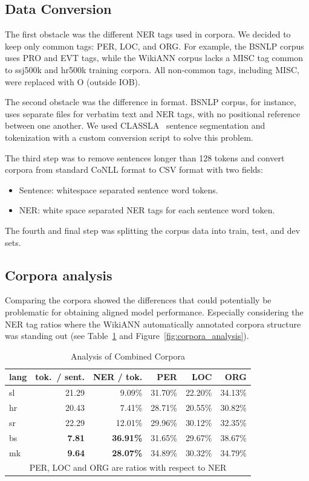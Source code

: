 \documentclass[sigconf]{acmart}
\begin{document}
\subsection{Data Conversion}
\label{subsec:data-conversion}
The first obstacle was the different NER tags used in corpora.
We decided to keep only common tags: PER, LOC, and ORG\@.
For example, the BSNLP corpus uses PRO and EVT tags, while the WikiANN corpus lacks a MISC tag common to ssj500k and hr500k training corpora.
All non-common tags, including MISC, were replaced with O (outside IOB).

The second obstacle was the difference in format.
BSNLP corpus, for instance, uses separate files for verbatim text and NER tags, with no positional reference between one another.
We used CLASSLA~\cite{ljubesic-dobrovoljc-2019-neural} sentence segmentation and tokenization with a custom conversion script to solve this problem.

The third step was to remove sentences longer than 128 tokens and convert corpora from standard CoNLL format to CSV format with two fields:
\begin{itemize}
  \item Sentence: whitespace separated sentence word tokens.
  \item NER: white space separated NER tags for each sentence word token.
\end{itemize}

The fourth and final step was splitting the corpus data into train, test, and dev sets.

\subsection{Corpora analysis}
\label{subsec:corpora-analysis}
Comparing the corpora showed the differences that could potentially be problematic for obtaining aligned model performance.
Especially considering the NER tag ratios where the WikiANN automatically annotated corpora structure was standing
out (see Table~\ref{tab:corpora_analysis} and Figure~\ref{fig:corpora_analysis}).
\begin{table}[H]
  \caption{Analysis of Combined Corpora}
  \label{tab:corpora_analysis}
  \begin{tabular}{lrrrrr}
    \toprule
    lang&tok.\ / sent.&NER / tok.&PER&LOC&ORG\\
    \midrule
    sl&21.29&9.09\%&31.70\%&22.20\%&34.13\%\\
    hr&20.43&7.41\%&28.71\%&20.55\%&30.82\%\\
    sr&22.29&12.01\%&29.96\%&30.12\%&32.35\%\\
    bs&\textbf{7.81}&\textbf{36.91\%}&31.65\%&29.67\%&38.67\%\\
    mk&\textbf{9.64}&\textbf{28.07\%}&34.89\%&30.32\%&34.79\%\\
    \bottomrule
    \multicolumn{6}{c}{PER, LOC and ORG are ratios with respect to NER}
  \end{tabular}
\end{table}
\end{document}
